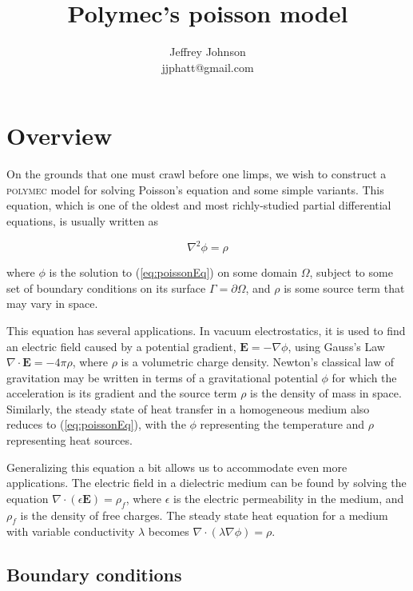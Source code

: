 \documentclass[12pt]{article}
\title{Polymec's poisson model}
\author{Jeffrey Johnson \\ 
jjphatt@gmail.com}
\newcommand{\labelSec}[1]{\label{sec:#1}}
\newcommand{\labelEq}[1]{\label{eq:#1}}
\newcommand{\refEq}[1]{(\ref{eq:#1})}
\newcommand{\polymec}{\textsc{polymec} }
\renewcommand{\vec}[1]{\mathbf{#1}}
\newcommand{\diverg}[1]{\nabla\cdot#1}
\newcommand{\grad}[1]{\nabla#1}
\newcommand{\laplacian}[1]{\nabla^2 #1}
\begin{document}
\maketitle

% 

\section{Overview}\labelSec{Overview}

On the grounds that one must crawl before one limps, we wish to construct a 
\polymec model for solving Poisson's equation and some simple variants. This 
equation, which is one of the oldest and most richly-studied partial differential 
equations, is usually written as

\begin{equation}
\laplacian{\phi} = \rho \labelEq{poissonEq}
\end{equation}

\noindent
where $\phi$ is the solution to \refEq{poissonEq} on some domain $\Omega$, 
subject to some set of boundary conditions on its surface $\Gamma = \partial\Omega$, 
and $\rho$ is some source term that may vary in space.

This equation has several applications. In vacuum electrostatics, it is used to find 
an electric field caused by a potential gradient, $\vec{E} = -\grad{\phi}$, 
using Gauss's Law $\diverg{\vec{E}} = -4\pi\rho$, where $\rho$ is a volumetric 
charge density. Newton's classical law of gravitation may be written in terms of a 
gravitational potential $\phi$ for which the acceleration is its gradient and 
the source term $\rho$ is the density of mass in space. Similarly, the steady 
state of heat transfer in a homogeneous medium also reduces to \refEq{poissonEq}, 
with the $\phi$ representing the temperature and $\rho$ representing heat sources.

Generalizing this equation a bit allows us to accommodate even more applications. 
The electric field in a dielectric medium can be found by solving the equation 
$\diverg{(\epsilon \vec{E})} = \rho_{f}$, where $\epsilon$ is the electric 
permeability in the medium, and $\rho_{f}$ is the density of free charges. 
The steady state heat equation for a medium with variable conductivity $\lambda$ 
becomes $\diverg{(\lambda \grad{\phi})} = \rho$.

\subsection*{Boundary conditions}
\end{document}
